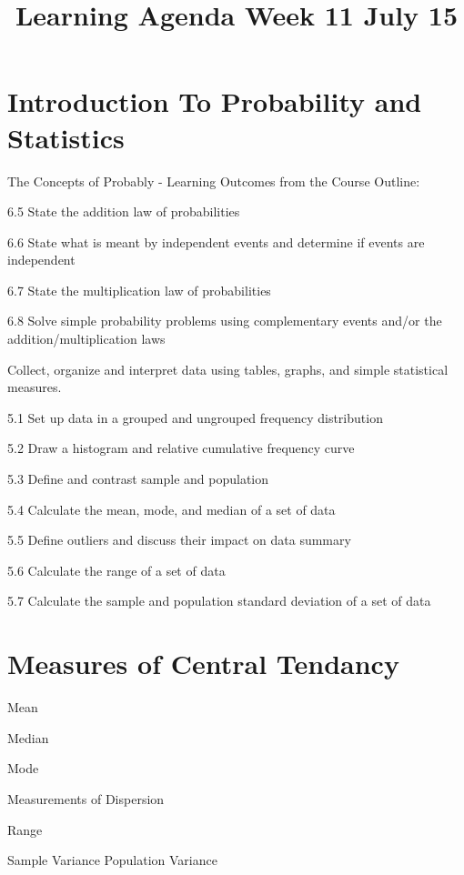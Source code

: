 \documentclass[16pt]{article}
\title{Learning Agenda Week 11 July 15}
\author{ }
\date{ }
\begin{document}
\maketitle

\section * {Introduction To Probability and Statistics}

The Concepts of Probably - Learning Outcomes from the Course Outline:

6.5 State the addition law of probabilities

6.6 State what is meant by independent events and determine if events are independent

6.7 State the multiplication law of probabilities

6.8 Solve simple probability problems using complementary events and/or the addition/multiplication laws

Collect, organize and interpret data using tables, graphs, and simple statistical measures.

5.1 Set up data in a grouped and ungrouped frequency distribution

5.2 Draw a histogram and relative cumulative frequency curve

5.3 Define and contrast sample and population

5.4 Calculate the mean, mode, and median of a set of data

5.5 Define outliers and discuss their impact on data summary

5.6 Calculate the range of a set of data

5.7 Calculate the sample and population standard deviation of a set of data




\section * {Measures of Central Tendancy}

Mean

Median

Mode 

Measurements of Dispersion

Range

Sample Variance
Population Variance
\end{document}
